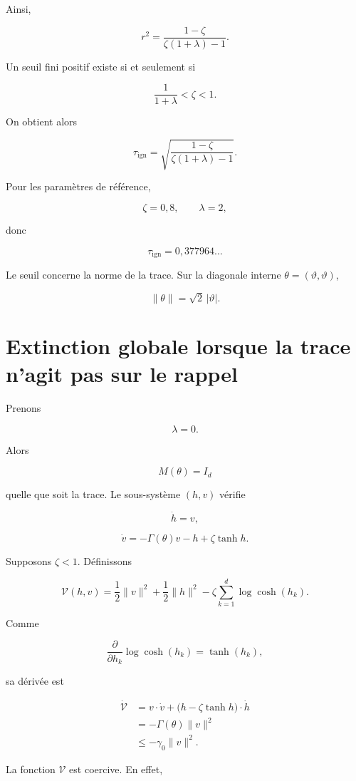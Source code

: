 Ainsi,

\[
r^2
=
\frac{1-\zeta}
{\zeta(1+\lambda)-1}.
\]

Un seuil fini positif existe si et seulement si

\[
\frac{1}{1+\lambda}<\zeta<1.
\]

On obtient alors

\[
\boxed{
\tau_{\mathrm{ign}}
=
\sqrt{
\frac{1-\zeta}
{\zeta(1+\lambda)-1}
}.
}
\]

Pour les paramètres de référence,

\[
\zeta=0{,}8,
\qquad
\lambda=2,
\]

donc

\[
\boxed{
\tau_{\mathrm{ign}}
=
0{,}377964\ldots
}
\]

Le seuil concerne la norme de la trace. Sur la diagonale interne
\(\theta=(\vartheta,\vartheta)\),

\[
\|\theta\|=\sqrt2\,|\vartheta|.
\]

\section{Extinction globale lorsque la trace n'agit pas sur le rappel}
\label{annexe-reduction-extinction-lambda-zero}

Prenons

\[
\lambda=0.
\]

Alors

\[
M(\theta)=I_d
\]

quelle que soit la trace. Le sous-système \((h,v)\) vérifie

\[
\dot h=v,
\]

\[
\dot v
=
-\Gamma(\theta)v
-h
+
\zeta\tanh h.
\]

Supposons \(\zeta<1\). Définissons

\[
\mathcal V(h,v)
=
\frac12\|v\|^2
+
\frac12\|h\|^2
-
\zeta
\sum_{k=1}^d\log\cosh(h_k).
\]

Comme

\[
\frac{\partial}{\partial h_k}
\log\cosh(h_k)
=
\tanh(h_k),
\]

sa dérivée est

\[
\begin{aligned}
\dot{\mathcal V}
&=
v\cdot\dot v
+
\bigl(h-\zeta\tanh h\bigr)\cdot\dot h
\\
&=
-\Gamma(\theta)\|v\|^2
\\
&\leq
-\gamma_0\|v\|^2.
\end{aligned}
\]

La fonction \(\mathcal V\) est coercive. En effet,

